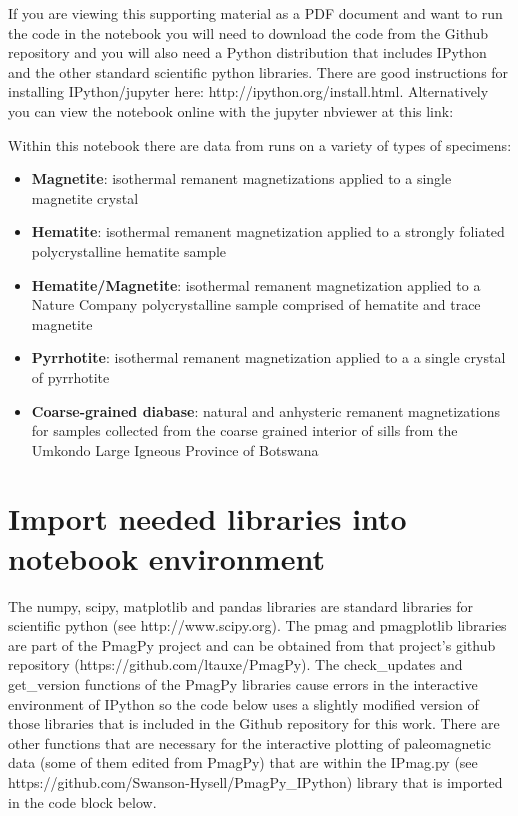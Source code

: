 \documentclass{article}
\begin{document}
If you are viewing this supporting material as a PDF document and want
to run the code in the notebook you will need to download the code from
the Github repository and you will also need a Python distribution that
includes IPython and the other standard scientific python libraries.
There are good instructions for installing IPython/jupyter here:
http://ipython.org/install.html. Alternatively you can view the notebook
online with the jupyter nbviewer at this link:

Within this notebook there are data from runs on a variety of types of
specimens:

\begin{itemize}
\itemsep1pt\parskip0pt
\item
  \textbf{Magnetite}: isothermal remanent magnetizations applied to a
  single magnetite crystal
\item
  \textbf{Hematite}: isothermal remanent magnetization applied to a
  strongly foliated polycrystalline hematite sample
\item
  \textbf{Hematite/Magnetite}: isothermal remanent magnetization applied
  to a Nature Company polycrystalline sample comprised of hematite and
  trace magnetite
\item
  \textbf{Pyrrhotite}: isothermal remanent magnetization applied to a a
  single crystal of pyrrhotite
\item
  \textbf{Coarse-grained diabase}: natural and anhysteric remanent
  magnetizations for samples collected from the coarse grained interior
  of sills from the Umkondo Large Igneous Province of Botswana
\end{itemize}


    \section{Import needed libraries into notebook environment}


    The numpy, scipy, matplotlib and pandas libraries are standard libraries
for scientific python (see http://www.scipy.org). The pmag and
pmagplotlib libraries are part of the PmagPy project and can be obtained
from that project's github repository
(https://github.com/ltauxe/PmagPy). The check\_updates and get\_version
functions of the PmagPy libraries cause errors in the interactive
environment of IPython so the code below uses a slightly modified
version of those libraries that is included in the Github repository for
this work. There are other functions that are necessary for the
interactive plotting of paleomagnetic data (some of them edited from
PmagPy) that are within the IPmag.py (see
https://github.com/Swanson-Hysell/PmagPy\_IPython) library that is
imported in the code block below.
\end{document}
